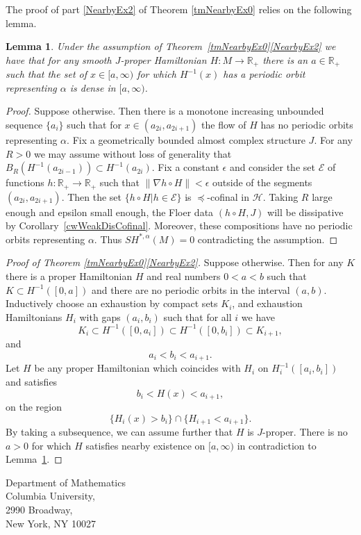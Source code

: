 \documentclass[11pt]{amsart}
\newcommand{\R}{\mathbb{R}}
\newtheorem{lm}[tm]{Lemma}
\theoremstyle{definition}
\theoremstyle{remark}
\begin{document}
The proof of part \ref{NearbyEx2} of Theorem \ref{tmNearbyEx0} relies on the following lemma.
\begin{lm}\label{lmNearbyEx2}
Under the assumption of Theorem~\ref{tmNearbyEx0}\ref{NearbyEx2} we have that for any smooth $J$-proper Hamiltonian $H:M\to\R_+$ there is an $a\in\R_+$ such that the set of $x\in[a,\infty)$ for which $H^{-1}(x)$ has a periodic orbit representing $\alpha$ is dense in $[a,\infty)$.
\end{lm}
\begin{proof}
Suppose otherwise. Then there is a monotone increasing unbounded sequence $\{a_i\}$ such that for $x\in (a_{2i},a_{2i+1})$ the flow of $H$ has no periodic orbits representing $\alpha$. Fix a geometrically bounded almost complex structure $J$. For any $R>0$ we may assume without loss of generality that $B_R(H^{-1}(a_{2i-1}))\subset H^{-1}(a_{2i})$. Fix a constant $\epsilon$ and consider the set $\mathcal{E}$ of functions $h:\R_+\to\R_+$ such that $\|\nabla h\circ H\|<\epsilon$ outside  of the segments $(a_{2i},a_{2i+1})$. Then the set $\{h\circ H|h\in\mathcal{E}\}$ is $\preceq$-cofinal in $\mathcal{H}$. Taking $R$ large enough and epsilon small enough, the Floer data $(h\circ H,J)$ will be dissipative by Corollary~\ref{cwWeakDisCofinal}. Moreover, these compositions  have no periodic orbits representing $\alpha$. Thus $SH^{*,\alpha}(M)=0$ contradicting the assumption.
\end{proof}


\begin{proof}[Proof of Theorem \ref{tmNearbyEx0}\ref{NearbyEx2}]
Suppose otherwise. Then for any $K$ there is a proper Hamiltonian $H$ and real numbers $0<a<b$ such that $K\subset H^{-1}([0,a])$ and there are no periodic orbits in the interval $(a,b)$. Inductively choose an exhaustion by compact sets $K_i$, and exhaustion Hamiltonians $H_i$ with gaps $(a_i,b_i)$ such that for all $i$ we have
\[
K_i\subset H^{-1}([0,a_i])\subset H^{-1}([0,b_i])\subset K_{i+1},
\]
and
\[
a_i<b_i<a_{i+1}.
\]
Let $H$ be any proper Hamiltonian  which coincides with $H_i$ on $H_i^{-1}([a_i,b_i])$ and satisfies
\[
b_i<H(x)<a_{i+1},
\]
on the region
\[
\{H_i(x)>b_i\}\cap\{H_{i+1}<a_{i+1}\}.
\]
By taking a subsequence, we can assume further that $H$ is $J$-proper. There is no $a>0$ for which $H$ satisfies nearby existence on $[a,\infty)$ in contradiction to Lemma~\ref{lmNearbyEx2}.
\end{proof}



\vspace{.5 cm}
\noindent
Department of Mathematics\\
Columbia University,\\
2990 Broadway,\\
New York, NY 10027\\
\end{document}

